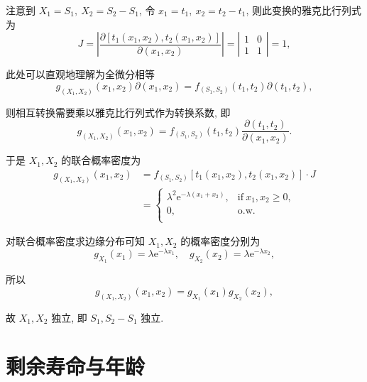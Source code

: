 \documentclass[openany]{ctexbook}
\theoremstyle{kaiti}
\theoremstyle{normal}
\begin{document}
  注意到 $X_1=S_1,~X_2=S_2-S_1$, 令 $x_1=t_1,~x_2=t_2-t_1$, 则此变换的雅克比行列式为
\begin{equation}
    J=\left|\frac{\partial[t_1(x_1,x_2),t_2(x_1,x_2)]}{\partial(x_1,x_2)}\right|=\left|\begin{matrix}1 & 0\\ 1&1\end{matrix}\right|=1,
\end{equation}
  
  此处可以直观地理解为全微分相等
\begin{equation}
    g_{(X_1,X_2)}(x_1,x_2)\partial(x_1,x_2)=f_{(S_1,S_2)}(t_1,t_2)\partial(t_1,t_2),
\end{equation}
  
  则相互转换需要乘以雅克比行列式作为转换系数, 即
\begin{equation}
    g_{(X_1,X_2)}(x_1,x_2)=f_{(S_1,S_2)}(t_1,t_2)\frac{\partial(t_1,t_2)}{\partial(x_1,x_2)}.
\end{equation}
  
  于是 $X_1,X_2$ 的联合概率密度为
\begin{equation}
    \begin{aligned}
      g_{(X_1,X_2)}(x_1,x_2)&=f_{(S_1,S_2)}[t_1(x_1,x_2),t_2(x_1,x_2)]\cdot J\\
      &=\begin{cases}
        \lambda^2\mathrm{e}^{-\lambda (x_1+x_2)}, &\text{if}~x_1,x_2\geqslant0,\\
        0, &\text{o.w.}\\
      \end{cases}
    \end{aligned}
\end{equation}
  
  对联合概率密度求边缘分布可知 $X_1,X_2$ 的概率密度分别为
\begin{equation}
    g_{X_1}(x_1)=\lambda\mathrm{e}^{-\lambda x_1},\quad g_{X_2}(x_2)=\lambda\mathrm{e}^{-\lambda x_2},
\end{equation}
  
  所以
\begin{equation}
    g_{(X_1,X_2)}(x_1,x_2)=g_{X_1}(x_1)g_{X_2}(x_2),
\end{equation}
  
  故 $X_1,X_2$ 独立, 即 $S_1,S_2-S_1$ 独立.
  
\section{剩余寿命与年龄}
  
\end{document}
